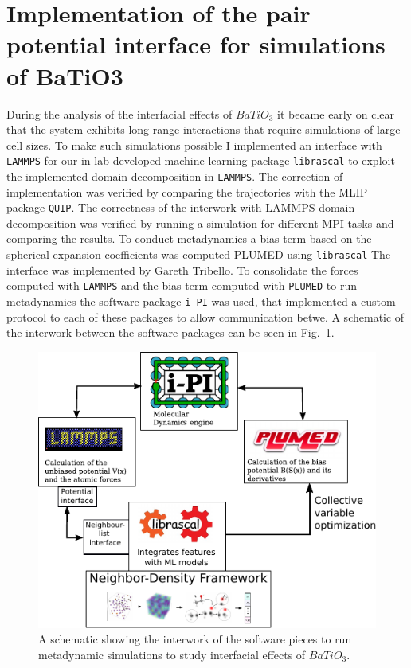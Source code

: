 \section{Implementation of the pair potential interface for simulations of BaTiO3}
During the analysis of the interfacial effects of $BaTiO_3$ it became early on clear that the system exhibits long-range interactions that require simulations of large cell sizes.
To make such simulations possible I implemented an interface with \texttt{LAMMPS} for our in-lab developed machine learning package \texttt{librascal} to exploit the implemented domain decomposition in \texttt{LAMMPS}.
The correction of implementation was verified by comparing the trajectories with the MLIP package \texttt{QUIP}.
The correctness of the interwork with LAMMPS domain decomposition was verified by running a simulation for different MPI tasks and comparing the results.
To conduct metadynamics a bias term based on the spherical expansion coefficients was computed PLUMED using \texttt{librascal}
The interface was implemented by Gareth Tribello.
To consolidate the forces computed with \texttt{LAMMPS} and the bias term computed with \texttt{PLUMED} to run metadynamics the software-package \texttt{i-PI} was used, that implemented a custom protocol to each of these packages to allow communication betwe.
A schematic of the interwork between the software packages can be seen in Fig.~\ref{fig:ipi-librascal-plumed}.
\begin{figure}
    \includegraphics[width=\textwidth]{fig/ipi-librascal-plumed.pdf}
    \caption{A schematic showing the interwork of the software pieces to run metadynamic simulations to study interfacial effects of $BaTiO_3$.}
    \label{fig:ipi-librascal-plumed}
\end{figure}

